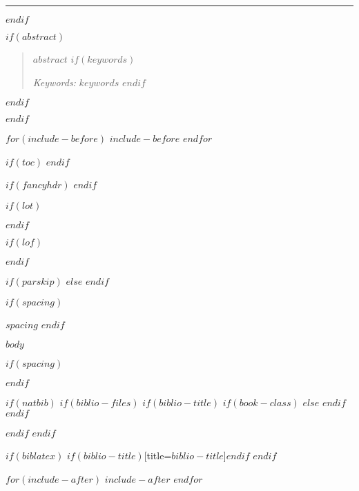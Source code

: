 \documentclass[$if(fontsize)$$fontsize$,$endif$$if(lang)$$lang$,$endif$$if(papersize)$$papersize$,$endif$$for(classoption)$$classoption$$sep$,$endfor$]{$documentclass$}
\begin{document}
\noindent\rule{\textwidth}{2pt}

\vspace{0.6cm}
$endif$

$if(abstract)$
\begin{abstract}
\noindent $abstract$
$if(keywords)$

\emph{Keywords:} $keywords$
$endif$
\end{abstract}
$endif$

$endif$

$for(include-before)$
$include-before$
$endfor$

$if(toc)$
\tableofcontents
\clearpage
$endif$

$if(fancyhdr)$
\pagestyle{mainstyle}
$endif$

$if(lot)$
\listoftables
\clearpage
$endif$

$if(lof)$
\listoffigures
\clearpage
$endif$

$if(parskip)$
\setlength{\parskip}{$parskip$}
$else$
\setlength{\parskip}{11pt}
$endif$

$if(spacing)$
\begin{spacing}{$spacing$}
$endif$

$body$

$if(spacing)$
\end{spacing}
$endif$

$if(natbib)$
$if(biblio-files)$
$if(biblio-title)$
$if(book-class)$
\renewcommand\bibname{$biblio-title$}
$else$
\renewcommand\refname{$biblio-title$}
$endif$
$endif$

$endif$
$endif$

$if(biblatex)$
\printbibliography$if(biblio-title)$[title=$biblio-title$]$endif$
$endif$

$for(include-after)$
$include-after$
$endfor$
\end{document}
